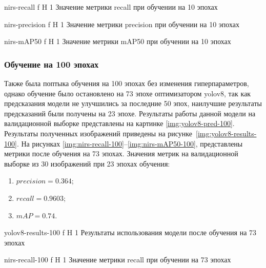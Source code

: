 {nirs-recall} %
{f} %
{H} %
{1\textwidth} %
{Значение метрики recall при обучении на 10 эпохах} %


{nirs-precision} %
{f} %
{H} %
{1\textwidth} %
{Значение метрики precision при обучении на 10 эпохах} %


{nirs-mAP50} %
{f} %
{H} %
{1\textwidth} %
{Значение метрики mAP50 при обучении на 10 эпохах} %

\subsubsection{Обучение на 100 эпохах}
Также была поптыка обучения на 100 эпохах без изменения гиперпараметров, однако обучение было остановлено на 73 эпохе оптимизатором yolov8, так как предсказания модели не улучшились
за последние 50 эпох, наилучшие результаты предсказаний были получены на 23 эпохе. Результаты работы данной модели на валидационной выборке представлены на картинке \ref{img:yolov8-pred-100}.
Результаты полученных изображений приведены на рисунке~\ref{img:yolov8-results-100}.
На рисунках \ref{img:nirs-recall-100}--\ref{img:nirs-mAP50-100}, представлены метрики после обучения на 73 эпохах.
Значения метрик  на валидационной выборке из 30 изображений при 23 эпохах обучения:
\begin{enumerate}
	\item $precision=0.364$;
	\item $recall=0.9603$;
	\item $mAP=0.74$.
\end{enumerate}


{yolov8-results-100} %
{f} %
{H} %
{1\textwidth} %
{Результаты использования модели после обучения на 73 эпохах} %

{nirs-recall-100} %
{f} %
{H} %
{1\textwidth} %
{Значение метрики recall при обучении на 73 эпохах} %



